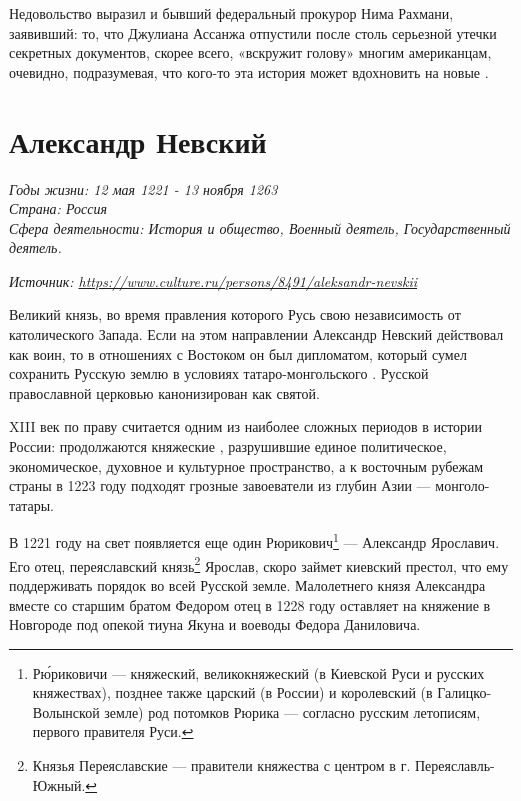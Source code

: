 Недовольство выразил и бывший федеральный прокурор Нима Рахмани, заявивший: то, что Джулиана Ассанжа отпустили после столь серьезной утечки секретных документов, скорее всего, «вскружит голову» многим американцам, очевидно, подразумевая, что кого-то эта история может вдохновить на новые .

\clearpage

\section{Александр Невский}

 {\it Годы жизни: 12 мая 1221 - 13 ноября 1263\\
  Страна: Россия\\
  Сфера деятельности: История и общество, Военный деятель, Государственный деятель.\\}

\textit{Источник: \url{https://www.culture.ru/persons/8491/aleksandr-nevskii}}

Великий князь, во время правления которого Русь  свою независимость от католического Запада. Если на этом направлении Александр Невский действовал как воин, то в отношениях с Востоком он был дипломатом, который сумел сохранить Русскую землю в условиях татаро-монгольского . Русской православной церковью канонизирован как святой.

XIII век по праву считается одним из наиболее сложных периодов в истории России: продолжаются княжеские , разрушившие единое политическое, экономическое, духовное и культурное пространство, а к восточным рубежам страны в 1223 году подходят грозные завоеватели из глубин Азии --- монголо-татары.

В 1221 году на свет появляется еще один Рюрикович\footnote{Р\'{ю}риковичи --- княжеский, великокняжеский (в Киевской Руси и русских княжествах), позднее также царский (в России) и королевский (в Галицко-Волынской земле) род потомков Рюрика --- согласно русским летописям, первого правителя Руси.} --- Александр Ярославич. Его отец, переяславский князь\footnote{Князья Переяславские --- правители княжества с центром в г. Переяславль-Южный.} Ярослав, скоро займет киевский престол, что  ему поддерживать порядок во всей Русской земле. Малолетнего князя Александра вместе со старшим братом Федором отец в 1228 году оставляет на княжение в Новгороде под опекой тиуна Якуна и воеводы Федора Даниловича.

